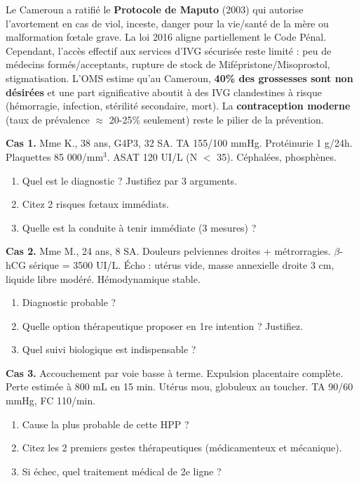 \documentclass[11pt]{article}
\begin{document}
\begin{savaistu}
Le Cameroun a ratifié le \textbf{Protocole de Maputo} (2003) qui autorise l'avortement en cas de viol, inceste, danger pour la vie/santé de la mère ou malformation fœtale grave. La loi 2016 aligne partiellement le Code Pénal. Cependant, l'accès effectif aux services d'IVG sécurisée reste limité : peu de médecins formés/acceptants, rupture de stock de Mifépristone/Misoprostol, stigmatisation. L'OMS estime qu'au Cameroun, \textbf{40\% des grossesses sont non désirées} et une part significative aboutit à des IVG clandestines à risque (hémorragie, infection, stérilité secondaire, mort). La \textbf{contraception moderne} (taux de prévalence $\approx$ 20-25\% seulement) reste le pilier de la prévention.
\end{savaistu}

\begin{exercice}
\textbf{Cas 1.} Mme K., 38 ans, G4P3, 32 SA. TA 155/100 mmHg. Protéinurie 1 g/24h. Plaquettes 85 000/mm$^3$. ASAT 120 UI/L (N $<$ 35). Céphalées, phosphènes.
\begin{enumerate}
    \item Quel est le diagnostic ? Justifiez par 3 arguments.
    \item Citez 2 risques fœtaux immédiats.
    \item Quelle est la conduite à tenir immédiate (3 mesures) ?
\end{enumerate}

\textbf{Cas 2.} Mme M., 24 ans, 8 SA. Douleurs pelviennes droites + métrorragies. $\beta$-hCG sérique = 3500 UI/L. Écho : utérus vide, masse annexielle droite 3 cm, liquide libre modéré. Hémodynamique stable.
\begin{enumerate}
    \item Diagnostic probable ?
    \item Quelle option thérapeutique proposer en 1re intention ? Justifiez.
    \item Quel suivi biologique est indispensable ?
\end{enumerate}

\textbf{Cas 3.} Accouchement par voie basse à terme. Expulsion placentaire complète. Perte estimée à 800 mL en 15 min. Utérus mou, globuleux au toucher. TA 90/60 mmHg, FC 110/min.
\begin{enumerate}
    \item Cause la plus probable de cette HPP ?
    \item Citez les 2 premiers gestes thérapeutiques (médicamenteux et mécanique).
    \item Si échec, quel traitement médical de 2e ligne ?
\end{enumerate}
\end{exercice}
\end{document}
